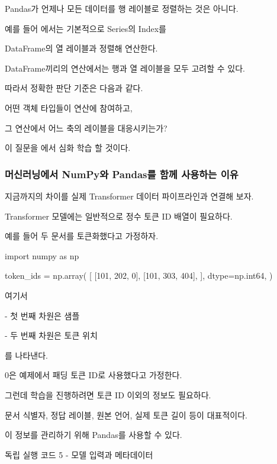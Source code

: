 Pandas가 언제나 모든 데이터를 행 레이블로 정렬하는 것은 아니다.

예를 들어 에서는 기본적으로 Series의 Index를

DataFrame의 열 레이블과 정렬해 연산한다.

DataFrame끼리의 연산에서는 행과 열 레이블을 모두 고려할 수 있다.

따라서 정확한 판단 기준은 다음과 같다.

\begin{dhksmry}[centered]
어떤 객체 타입들이 연산에 참여하고,

그 연산에서 어느 축의 레이블을 대응시키는가?
\end{dhksmry}

이 질문을 에서 심화 학습 할 것이다.

\subsubsection{머신러닝에서 NumPy와 Pandas를 함께 사용하는 이유}

지금까지의 차이를 실제 Transformer 데이터 파이프라인과 연결해 보자.

Transformer 모델에는 일반적으로 정수 토큰 ID 배열이 필요하다.

예를 들어 두 문서를 토큰화했다고 가정하자.

\begin{dhkcode}
import numpy as np

token_ids = np.array(
    [
        [101, 202, 0],
        [101, 303, 404],
    ],
    dtype=np.int64,
)
\end{dhkcode}

여기서

\begin{dhksmry}
   - 첫 번째 차원은 샘플

   - 두 번째 차원은 토큰 위치
\end{dhksmry}

를 나타낸다.

0은 예제에서 패딩 토큰 ID로 사용했다고 가정한다.

그런데 학습을 진행하려면 토큰 ID 이외의 정보도 필요하다.

문서 식별자, 정답 레이블, 원본 언어, 실제 토큰 길이 등이 대표적이다.

이 정보를 관리하기 위해 Pandas를 사용할 수 있다.

\begin{dhknote}
\begin{dhksmry}[centered]
독립 실행 코드 5 - 모델 입력과 메타데이터
\end{dhksmry}
\end{dhknote}

